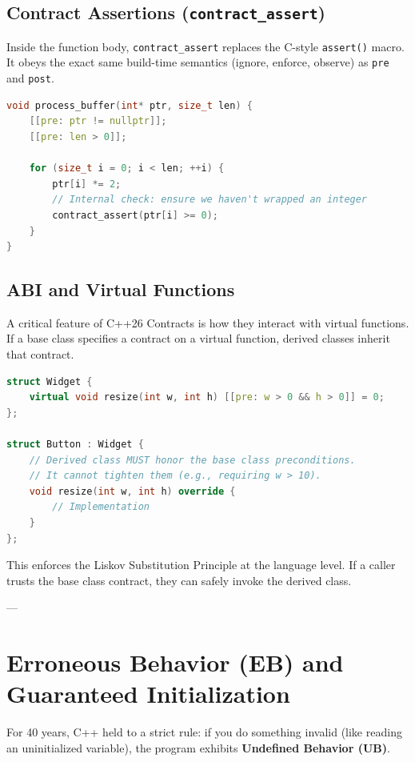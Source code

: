 {{\subsection{Contract Assertions (\texttt{contract_assert})}

Inside the function body, \texttt{contract_assert} replaces the C-style \texttt{assert()} macro. It obeys the exact same build-time semantics (ignore, enforce, observe) as \texttt{pre} and \texttt{post}.

\begin{lstlisting}[language=C++]
void process_buffer(int* ptr, size_t len) {
    [[pre: ptr != nullptr]];
    [[pre: len > 0]];
    
    for (size_t i = 0; i < len; ++i) {
        ptr[i] *= 2;
        // Internal check: ensure we haven't wrapped an integer
        contract_assert(ptr[i] >= 0); 
    }
}
\end{lstlisting}

\subsection{ABI and Virtual Functions}

A critical feature of C++26 Contracts is how they interact with virtual functions. If a base class specifies a contract on a virtual function, derived classes inherit that contract. 

\begin{lstlisting}[language=C++]
struct Widget {
    virtual void resize(int w, int h) [[pre: w > 0 && h > 0]] = 0;
};

struct Button : Widget {
    // Derived class MUST honor the base class preconditions.
    // It cannot tighten them (e.g., requiring w > 10).
    void resize(int w, int h) override {
        // Implementation
    }
};
\end{lstlisting}

This enforces the Liskov Substitution Principle at the language level. If a caller trusts the base class contract, they can safely invoke the derived class.

---

\section{Erroneous Behavior (EB) and Guaranteed Initialization}

For 40 years, C++ held to a strict rule: if you do something invalid (like reading an uninitialized variable), the program exhibits \textbf{Undefined Behavior (UB)}. 

}}
